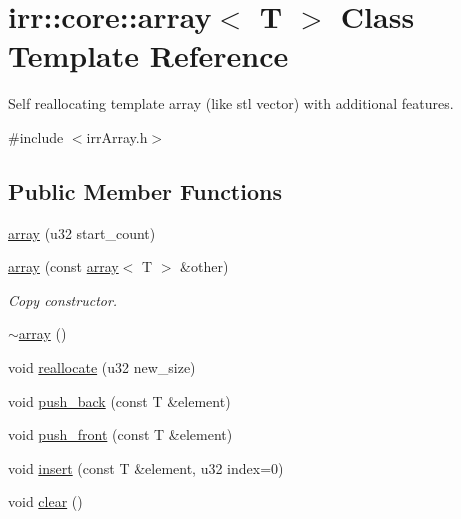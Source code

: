 \hypertarget{classirr_1_1core_1_1array}{\section{irr\+:\+:core\+:\+:array$<$ T $>$ Class Template Reference}
\label{classirr_1_1core_1_1array}
}


Self reallocating template array (like stl vector) with additional features.  




{\ttfamily \#include $<$irr\+Array.\+h$>$}

\subsection*{Public Member Functions}
\begin{DoxyCompactItemize}
\item 
\hyperlink{classirr_1_1core_1_1array_acdf3e210bef431b4b789d616c6048b56}{array} (u32 start\+\_\+count)
\item 
\hypertarget{classirr_1_1core_1_1array_addc7b26c37e43024be3240344ef7ae4b}{\hyperlink{classirr_1_1core_1_1array_addc7b26c37e43024be3240344ef7ae4b}{array} (const \hyperlink{classirr_1_1core_1_1array}{array}$<$ T $>$ \&other)}\label{classirr_1_1core_1_1array_addc7b26c37e43024be3240344ef7ae4b}

\begin{DoxyCompactList}\small\item\em Copy constructor. \end{DoxyCompactList}\item 
\hyperlink{classirr_1_1core_1_1array_a66774d7073dfe9794c1190b4a9fee73c}{$\sim$array} ()
\item 
void \hyperlink{classirr_1_1core_1_1array_a1fa222a8692a1e2da94bc7e86b75cdae}{reallocate} (u32 new\+\_\+size)
\item 
void \hyperlink{classirr_1_1core_1_1array_a95afc36513d08abb51bd399755730877}{push\+\_\+back} (const T \&element)
\item 
void \hyperlink{classirr_1_1core_1_1array_a27ce37ef9e34e55d4f9987c62deda9d6}{push\+\_\+front} (const T \&element)
\item 
void \hyperlink{classirr_1_1core_1_1array_a7dd91405226e52db0c5a26add9f8e106}{insert} (const T \&element, u32 index=0)
\item 
\hypertarget{classirr_1_1core_1_1array_a611c70809111b608a103f86e004d6eb7}{void \hyperlink{classirr_1_1core_1_1array_a611c70809111b608a103f86e004d6eb7}{clear} ()}\label{classirr_1_1core_1_1array_a611c70809111b608a103f86e004d6eb7}


\end{DoxyCompactItemize}

